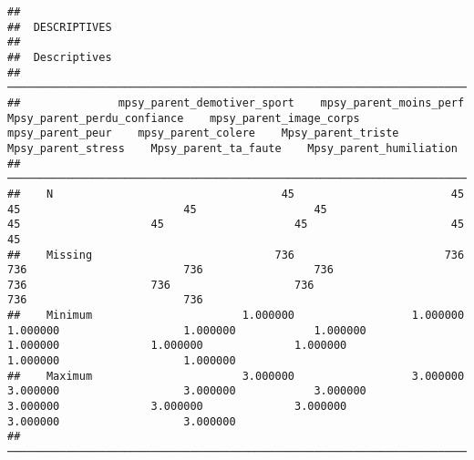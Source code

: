 \documentclass[
]{article}
\begin{document}
\begin{verbatim}
## 
##  DESCRIPTIVES
## 
##  Descriptives                                                                                                                                                                                                                                                            
##  ─────────────────────────────────────────────────────────────────────────────────────────────────────────────────────────────────────────────────────────────────────────────────────────────────────────────────────────────────────────────────────────────────────── 
##               mpsy_parent_demotiver_sport    mpsy_parent_moins_perf    Mpsy_parent_perdu_confiance    mpsy_parent_image_corps    mpsy_parent_peur    mpsy_parent_colere    Mpsy_parent_triste    Mpsy_parent_stress    Mpsy_parent_ta_faute    Mpsy_parent_humiliation   
##  ─────────────────────────────────────────────────────────────────────────────────────────────────────────────────────────────────────────────────────────────────────────────────────────────────────────────────────────────────────────────────────────────────────── 
##    N                                   45                        45                             45                         45                  45                    45                    45                    45                      45                         45   
##    Missing                            736                       736                            736                        736                 736                   736                   736                   736                     736                        736   
##    Minimum                       1.000000                  1.000000                       1.000000                   1.000000            1.000000              1.000000              1.000000              1.000000                1.000000                   1.000000   
##    Maximum                       3.000000                  3.000000                       3.000000                   3.000000            3.000000              3.000000              3.000000              3.000000                3.000000                   3.000000   
##  ───────────────────────────────────────────────────────────────────────────────────────────────────────────────────────────────────────────────────────────────────────────────────────────────────────────────────────────────────────────────────────────────────────
\end{verbatim}
\end{document}
